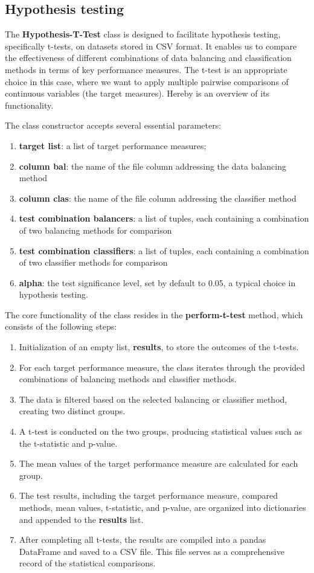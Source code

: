 \subsection{Hypothesis testing}
The \textbf{Hypothesis-T-Test} class is designed to facilitate hypothesis testing, specifically t-tests, on datasets stored in CSV format. It enables us to compare the effectiveness of different combinations of data balancing and classification methods in terms of key performance measures. The t-test is an appropriate choice in this case, where we want to apply multiple pairwise comparisons of continuous variables (the target measures). Hereby is an overview of its functionality.

The class constructor accepts several essential parameters: 
\begin{enumerate}[label=$\bullet$]
\item \textbf{target list}: a list of target performance measures;
\item \textbf{column bal}: the name of the file column addressing the data balancing method
\item \textbf{column clas}: the name of the file column addressing the classifier method
\item \textbf{test combination balancers}: a list of tuples, each containing a combination of two balancing methods for comparison
\item \textbf{test combination classifiers}: a list of tuples, each containing a combination of two classifier methods for comparison
\item \textbf{alpha}: the test significance level, set by default to 0.05, a typical choice in hypothesis testing. 
\end{enumerate}

The core functionality of the class resides in the \textbf{perform-t-test} method, which consists of the following steps:
\begin{enumerate}[label=$\bullet$]
\item Initialization of an empty list, \textbf{results}, to store the outcomes of the t-tests.
\item For each target performance measure, the class iterates through the provided combinations of balancing methods and classifier methods.
\item The data is filtered based on the selected balancing or classifier method, creating two distinct groups.
\item A t-test is conducted on the two groups, producing statistical values such as the t-statistic and p-value.
\item The mean values of the target performance measure are calculated for each group.
\item The test results, including the target performance measure, compared methods, mean values, t-statistic, and p-value, are organized into dictionaries and appended to the \textbf{results} list.
\item After completing all t-tests, the results are compiled into a pandas DataFrame and saved to a CSV file. This file serves as a comprehensive record of the statistical comparisons.
\end{enumerate}


